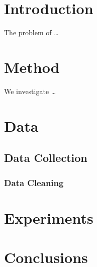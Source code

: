 \documentclass{article}
\begin{document}
\section{Introduction}
The problem of \ldots

\section{Method}
We investigate \ldots

\section{Data}
\subsection{Data Collection}
\subsubsection{Data Cleaning}

\section{Experiments}

\section{Conclusions}
\end{document}
